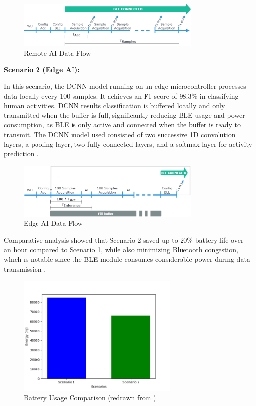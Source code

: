 \begin{figure}[h]
	\centering
	\includegraphics[width=0.8\textwidth]{images/senerio1}
	\caption{Remote AI Data Flow~\cite{Muhoza2023}}
	\label{fig:remote_ai}
\end{figure}

\noindent\textbf{Scenario 2 (Edge AI):}

\noindent In this scenario, the DCNN model running on an edge microcontroller processes data locally every 100 samples. It achieves an F1 score of 98.3\% in classifying human activities. DCNN results classification is buffered locally and only transmitted when the buffer is full, significantly reducing BLE usage and power consumption, as BLE is only active and connected when the buffer is ready to transmit. The DCNN model used consisted of two successive 1D convolution layers, a pooling layer, two fully connected layers, and a softmax layer for activity prediction \cite{Muhoza2023}.

\begin{figure}[h]
	\centering
	\includegraphics[width=0.8\textwidth]{images/SENERIO2}
	\caption{Edge AI Data Flow~\cite{Muhoza2023}}
	\label{fig:edge_ai}
\end{figure}

\noindent Comparative analysis showed that Scenario 2 saved up to 20\% battery life over an hour compared to Scenario 1, while also minimizing Bluetooth congestion, which is notable since the BLE module consumes considerable power during data transmission \cite{Muhoza2023}.

\begin{figure}[h]
	\centering
	\includegraphics[width=0.7\textwidth]{images/senerio comparision}
	\caption{Battery Usage Comparison (redrawn from \cite{Muhoza2023})}
	\label{fig:battery_usage}
\end{figure}

